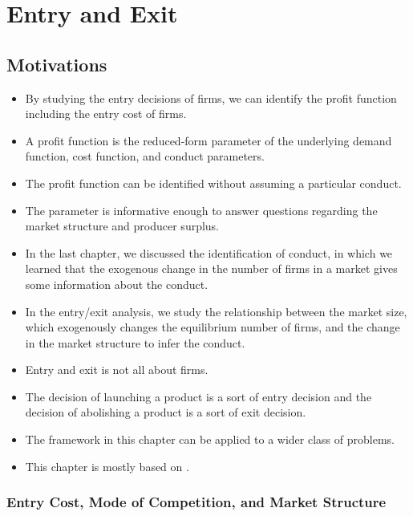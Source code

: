 \documentclass[
]{book}
\providecommand{\tightlist}{%
  \setlength{\itemsep}{0pt}\setlength{\parskip}{0pt}}
\begin{document}
\hypertarget{entryexit}{%
\chapter{Entry and Exit}\label{entryexit}}

\hypertarget{motivations}{%
\section{Motivations}\label{motivations}}

\begin{itemize}
\tightlist
\item
  By studying the entry decisions of firms, we can identify the profit function including the entry cost of firms.
\item
  A profit function is the reduced-form parameter of the underlying demand function, cost function, and conduct parameters.
\item
  The profit function can be identified without assuming a particular conduct.
\item
  The parameter is informative enough to answer questions regarding the market structure and producer surplus.
\item
  In the last chapter, we discussed the identification of conduct, in which we learned that the exogenous change in the number of firms in a market gives some information about the conduct.
\item
  In the entry/exit analysis, we study the relationship between the market size, which exogenously changes the equilibrium number of firms, and the change in the market structure to infer the conduct.
\item
  Entry and exit is not all about firms.
\item
  The decision of launching a product is a sort of entry decision and the decision of abolishing a product is a sort of exit decision.
\item
  The framework in this chapter can be applied to a wider class of problems.
\item
  This chapter is mostly based on \citet{berryIdentificationModelsOligopoly2006}.
\end{itemize}

\hypertarget{entry-cost-mode-of-competition-and-market-structure}{%
\subsection{Entry Cost, Mode of Competition, and Market Structure}\label{entry-cost-mode-of-competition-and-market-structure}}
\end{document}
